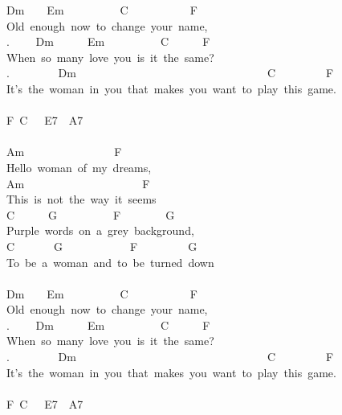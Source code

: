 {Dm\ \ \ \ Em\ \ \ \ \ \ \ \ \ \ C\ \ \ \ \ \ \ \ \ \ \ F\\
Old\ enough\ now\ to\ change\ your\ name,\\
. \ \ \ \ Dm\ \ \ \ \ \ Em\ \ \ \ \ \ \ \ \ \ C\ \ \ \ \ \ F\\
When\ so\ many\ love\ you\ is\ it\ the\ same?\\
. \ \ \ \ \ \ \ \ Dm\ \ \ \ \ \ \ \ \ \ \ \ \ \ \ \ \ \ \ \ \ \ \ \ \ \ \ \ \ \ \ \ \ \ C\ \ \ \ \ \ \ \ \ F\\
It's\ the\ woman\ in\ you\ that\ makes\ you\ want\ to\ play\ this\ game.\\
\\
F\ C\ \ \ E7\ \ A7\\
\\
Am\ \ \ \ \ \ \ \ \ \ \ \ \ \ \ \ F\\
Hello\ woman\ of\ my\ dreams,\\
Am\ \ \ \ \ \ \ \ \ \ \ \ \ \ \ \ \ \ \ \ \ F\\
This\ is\ not\ the\ way\ it\ seems\\
C\ \ \ \ \ \ G\ \ \ \ \ \ \ \ \ \ F\ \ \ \ \ \ \ \ G\\
Purple\ words\ on\ a\ grey\ background,\\
C\ \ \ \ \ \ \ G\ \ \ \ \ \ \ \ \ \ \ \ F\ \ \ \ \ \ \ \ \ G\\
To\ be\ a\ woman\ and\ to\ be\ turned\ down\\
\\
Dm\ \ \ \ Em\ \ \ \ \ \ \ \ \ \ C\ \ \ \ \ \ \ \ \ \ \ F\\
Old\ enough\ now\ to\ change\ your\ name,\\
. \ \ \ \ Dm\ \ \ \ \ \ Em\ \ \ \ \ \ \ \ \ \ C\ \ \ \ \ \ F\\
When\ so\ many\ love\ you\ is\ it\ the\ same?\\
. \ \ \ \ \ \ \ \ Dm\ \ \ \ \ \ \ \ \ \ \ \ \ \ \ \ \ \ \ \ \ \ \ \ \ \ \ \ \ \ \ \ \ \ C\ \ \ \ \ \ \ \ \ F\\
It's\ the\ woman\ in\ you\ that\ makes\ you\ want\ to\ play\ this\ game.\\
\\
F\ C\ \ \ E7\ \ A7\\
}
